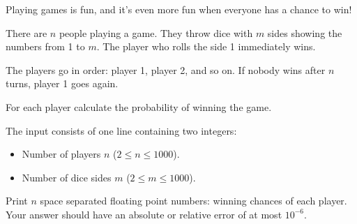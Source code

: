 \problemname{\problemyamlname}


\newcommand{\minn}{2}
\newcommand{\maxn}{1000}
\newcommand{\minm}{2}
\newcommand{\maxm}{1000}

Playing games is fun, and it's even more fun when everyone has a chance to win!

There are $n$ people playing a game. They throw dice with $m$ sides showing the numbers from 1 to $m$. The player who rolls the side 1 immediately wins.

The players go in order: player 1, player 2, and so on. If nobody wins after $n$ turns, player 1 goes again.

For each player calculate the probability of winning the game.

\begin{Input}
    The input consists of one line containing two integers:
    \begin{itemize}
        \item Number of players $n$ ($\minn \leq n\leq \maxn$).
        \item Number of dice sides $m$ ($\minm \leq m\leq \maxm$).
    \end{itemize}
\end{Input}

\begin{Output}
    Print $n$ space separated floating point numbers: winning chances of each player.
    Your answer should have an absolute or relative error of at most $10^{-6}$.
\end{Output}
